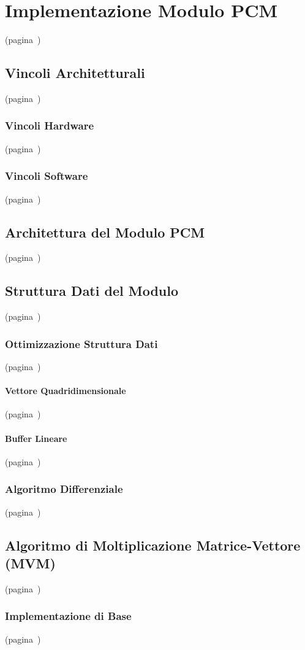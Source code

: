\chapter{Implementazione Modulo PCM} (pagina~\pageref{chap:module})
\section{Vincoli Architetturali}(pagina~\pageref{sec:arch_const})
\subsection{Vincoli Hardware}(pagina~\pageref{sec:hw_const})
\subsection{Vincoli Software}(pagina~\pageref{sec:sw_const})
\section{Architettura del Modulo PCM}(pagina~\pageref{sec:module_arch})
\section{Struttura Dati del Modulo}(pagina~\pageref{sec:module_data})
\subsection{Ottimizzazione Struttura Dati}(pagina~\pageref{sec:data_opt})
\subsubsection{Vettore Quadridimensionale}(pagina~\pageref{sec:4d_array})
\subsubsection{Buffer Lineare}(pagina~\pageref{sec:flat_buf})
\subsection{Algoritmo Differenziale}(pagina~\pageref{sec:diff_algo})
\section{Algoritmo di Moltiplicazione Matrice-Vettore (MVM)}(pagina~\pageref{sec:mvm_algo})
\subsection{Implementazione di Base}(pagina~\pageref{sec:std_imp})
